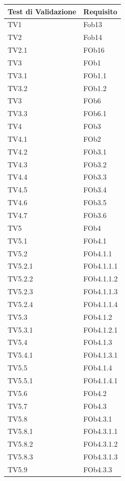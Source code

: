 \begin{longtable}{|p{5cm}|p{5cm}|}
	\hline
	\textbf{Test di Validazione} &\textbf{Requisito} \\
	\hline
	TV1 & Fob13\\
	\hline
	TV2& Fob14 \\
	\hline
	TV2.1 & FOb16\\
	\hline
	TV3 & FOb1 \\
	\hline
	TV3.1 & FOb1.1 \\
	\hline
	TV3.2 & FOb1.2 \\
	\hline
	TV3 & FOb6\\
	\hline
	TV3.3 & FOb6.1 \\
	\hline
	TV4 & FOb3 \\
	\hline
	TV4.1 & FOb2 \\
	\hline
	TV4.2 & FOb3.1 \\
	\hline
	TV4.3 & FOb3.2 \\
	\hline
	TV4.4 & FOb3.3 \\
	\hline
	TV4.5 & FOb3.4 \\
	\hline
	TV4.6 & FOb3.5 \\
	\hline
	TV4.7 & FOb3.6\\
	\hline
	TV5 & FOb4\\
	\hline
	TV5.1 & FOb4.1\\
	\hline
	TV5.2 & FOb4.1.1\\
	\hline
	TV5.2.1 & FOb4.1.1.1\\
	\hline
	TV5.2.2 & FOb4.1.1.2\\
	\hline
	TV5.2.3 & FOb4.1.1.3\\
	\hline
	TV5.2.4 & FOb4.1.1.4\\
	\hline
	TV5.3 & FOb4.1.2\\
	\hline
	TV5.3.1 & FOb4.1.2.1\\
	\hline
	TV5.4 & FOb4.1.3\\
	\hline
	TV5.4.1 & FOb4.1.3.1\\
	\hline
	TV5.5 & FOb4.1.4\\
	\hline
	TV5.5.1 & FOb4.1.4.1\\
	\hline
	TV5.6 & FOb4.2\\
	\hline
	TV5.7 & FOb4.3\\
	\hline
	TV5.8 & FOb4.3.1 \\ %
	\hline
	TV5.8.1 & FOb4.3.1.1\\
	\hline
	TV5.8.2 & FOb4.3.1.2\\
	\hline
	TV5.8.3 & FOb4.3.1.3\\
	\hline
	TV5.9 & FOb4.3.3\\ %

\end{longtable}
